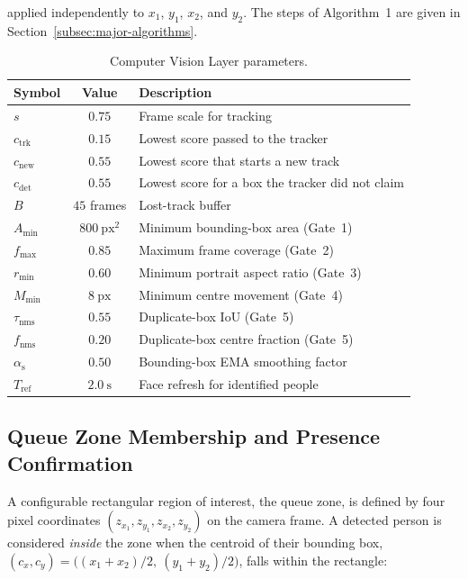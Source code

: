 \noindent applied independently to $x_1$, $y_1$, $x_2$, and $y_2$.
The steps of Algorithm~1 are given in
Section~\ref{subsec:major-algorithms}.


\begin{table}[H]
\centering
\caption{Computer Vision Layer parameters.}
\label{tab:cv-params}
\begin{tabular}{lcl}
\hline
Symbol & Value & Description \\
\hline
$s$                  & $0.75$               & Frame scale for tracking \\
$c_{\mathrm{trk}}$   & $0.15$               & Lowest score passed to the tracker \\
$c_{\mathrm{new}}$   & $0.55$               & Lowest score that starts a new track \\
$c_{\mathrm{det}}$   & $0.55$               & Lowest score for a box the tracker did not claim \\
$B$                  & $45$ frames          & Lost-track buffer \\
$A_{\min}$           & $800\ \mathrm{px}^2$ & Minimum bounding-box area (Gate~1) \\
$f_{\max}$           & $0.85$               & Maximum frame coverage (Gate~2) \\
$r_{\min}$           & $0.60$               & Minimum portrait aspect ratio (Gate~3) \\
$M_{\min}$           & $8\ \mathrm{px}$     & Minimum centre movement (Gate~4) \\
$\tau_{\mathrm{nms}}$ & $0.55$              & Duplicate-box IoU (Gate~5) \\
$f_{\mathrm{nms}}$   & $0.20$               & Duplicate-box centre fraction (Gate~5) \\
$\alpha_{\mathrm{s}}$ & $0.50$              & Bounding-box EMA smoothing factor \\
$T_{\mathrm{ref}}$   & $2.0\ \mathrm{s}$    & Face refresh for identified people \\
\hline
\end{tabular}
\end{table}

\subsection{Queue Zone Membership and Presence Confirmation}
\label{subsec:candidate}

A configurable rectangular region of interest, the queue zone, is
defined by four pixel coordinates $(z_{x_1}, z_{y_1}, z_{x_2}, z_{y_2})$
on the camera frame. A detected person is considered \emph{inside} the
zone when the centroid of their bounding box,
$(c_x, c_y) = \big((x_1+x_2)/2,\ (y_1+y_2)/2\big)$, falls within
the rectangle:

